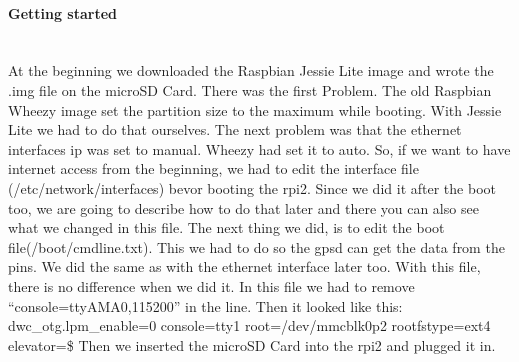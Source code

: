 \paragraph{Getting started} \mbox{}\\
At the beginning we downloaded the Raspbian Jessie Lite image and wrote the .img file on the microSD Card. \newline
There was the first Problem. \newline
The old Raspbian Wheezy image set the partition size to the maximum while booting. With Jessie Lite we had to do that ourselves. \newline
The next problem was that the ethernet interfaces \gls{ip} was set to manual. Wheezy had set it to auto. So, if we want to have internet access from the beginning, we had to edit the interface file (/etc/network/interfaces) bevor booting the \gls{rpi2}. Since we did it after the boot too, we are going to describe how to do that later and there you can also see what we changed in this file. \newline
The next thing we did, is to edit the boot file(/boot/cmdline.txt). This we had to do so the \gls{gpsd} can get the data from the pins. We did the same as with the ethernet interface later too. With this file, there is no difference when we did it. \newline
In this file we had to remove “console=ttyAMA0,115200” in the line. \newline
Then it looked like this: dwc\_otg.lpm\_enable=0 console=tty1 root=/dev/mmcblk0p2 rootfstype=ext4 elevator=\$ \newline
Then we inserted the microSD Card into the \gls{rpi2} and plugged it in.

